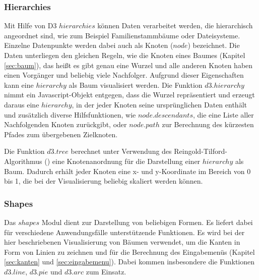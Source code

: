 \subsubsection*{Hierarchies}\label{sec:hierarchies}
Mit Hilfe von D3 $hierarchies$ können Daten verarbeitet werden, die hierarchisch angeordnet sind, wie zum Beispiel Familienstammbäume oder Dateisysteme. Einzelne Datenpunkte werden dabei auch als Knoten ($node$) bezeichnet. Die Daten unterliegen den gleichen Regeln, wie die Knoten eines Baumes (Kapitel \ref{sec:baum}), das heißt es gibt genau eine Wurzel und alle anderen Knoten haben einen Vorgänger und beliebig viele Nachfolger. Aufgrund dieser Eigenschaften kann eine $hierarchy$ als Baum visualisiert werden. Die Funktion $d3.hierarchy$ nimmt ein Javascript-Objekt entgegen, dass die Wurzel repräsentiert und erzeugt daraus eine $hierarchy$, in der jeder Knoten seine ursprünglichen Daten enthält und zusätzlich diverse Hilfsfunktionen, wie $node.descendants$, die eine Liste aller Nachfolgenden Knoten zurückgibt, oder $node.path$ zur Berechnung des kürzesten Pfades zum übergebenen Zielknoten.

Die Funktion $d3.tree$ berechnet unter Verwendung des Reingold-Tilford-Algorithmus (\citet{reingold1981tidier}) eine Knotenanordnung für die Darstellung einer $hierarchy$ als Baum. Dadurch erhält jeder Knoten eine x- und y-Koordinate im Bereich von 0 bis 1, die bei der Visualisierung beliebig skaliert werden können.

\subsubsection*{Shapes}\label{sec:shapes}
Das $shapes$ Modul dient zur Darstellung von beliebigen Formen. Es liefert dabei für verschiedene Anwendungsfälle unterstützende Funktionen. Es wird bei der hier beschriebenen Visualisierung von Bäumen verwendet, um die Kanten in Form von Linien zu zeichnen und für die Berechnung des Eingabemenüs (Kapitel \ref{sec:kanten} und \ref{sec:eingabemenu}). Dabei kommen insbesondere die Funktionen $d3.line$, $d3.pie$ und $d3.arc$ zum Einsatz.

